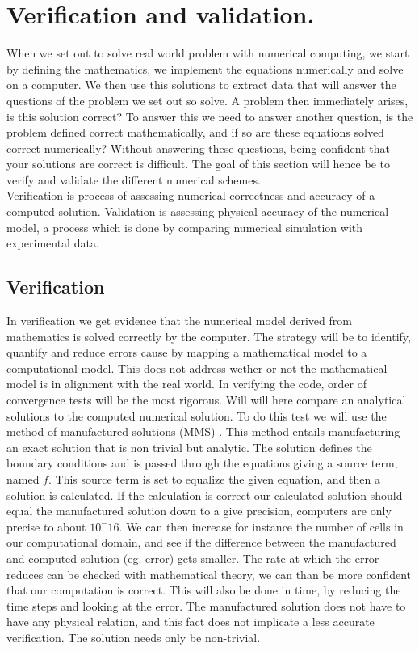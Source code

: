 \chapter{Verification and validation. }
When we set out to solve real world problem with numerical computing, we start by defining the mathematics, we implement the equations numerically and solve on a computer. We then use this solutions to extract data that will answer the questions of the problem we set out so solve. A problem then immediately arises, is this solution correct? To answer this we need to answer another question, is the problem defined correct mathematically, and if so are these equations solved correct numerically? Without answering these questions, being confident that your solutions are correct is difficult. \cite{Selin2014} The goal of this section will hence be to verify and validate the different numerical schemes. \\
Verification is process of assessing numerical correctness and accuracy of a computed solution. Validation is assessing physical accuracy of the numerical model, a process which is done by comparing numerical simulation with experimental data. 


\section{Verification}
In verification we get evidence that the numerical model derived from mathematics is solved correctly by the computer. The strategy will be to identify, quantify and reduce errors cause by mapping a mathematical model to a computational model. This does not address wether or not the mathematical model is in alignment with the real world. In verifying the code, order of convergence tests will be the most rigorous. Will will here compare an analytical solutions to the computed numerical solution. To do this test we will use the method of manufactured solutions (MMS) \cite{Roache2002}. This method entails manufacturing an exact solution that is non trivial but analytic. The solution defines the boundary conditions and is passed through the equations giving a source term, named $f$. This source term is set to equalize the given equation, and then a solution is calculated. If the calculation is correct our calculated solution should equal the manufactured solution down to a give precision, computers are only precise to about $10^-16$. We can then increase for instance the number of cells in our computational domain, and see if the difference between the manufactured and computed solution (eg. error) gets smaller. The rate at which the error reduces can be checked with mathematical theory, we can than be more confident that our computation is correct. This will also be done in time, by reducing the time steps and looking at the error. The manufactured solution does not have to have any physical relation, and this fact does not implicate a less accurate verification. The solution needs only be non-trivial.


